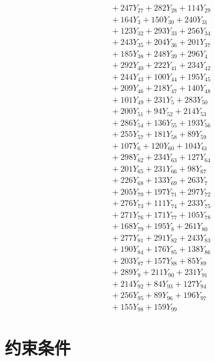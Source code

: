 \documentclass[a4paper,10pt]{article}
\begin{document}
{\begin{align}
&\quad  + 247Y_{27} + 282Y_{28} + 114Y_{29} \\[0.5ex]
&\quad  + 164Y_{3} + 150Y_{30} + 240Y_{31} \\[0.5ex]
&\quad  + 123Y_{32} + 293Y_{33} + 256Y_{34} \\[0.5ex]
&\quad  + 243Y_{35} + 204Y_{36} + 201Y_{37} \\[0.5ex]
&\quad  + 185Y_{38} + 248Y_{39} + 296Y_{4} \\[0.5ex]
&\quad  + 292Y_{40} + 222Y_{41} + 234Y_{42} \\[0.5ex]
&\quad  + 244Y_{43} + 100Y_{44} + 195Y_{45} \\[0.5ex]
&\quad  + 209Y_{46} + 218Y_{47} + 140Y_{48} \\[0.5ex]
&\quad  + 101Y_{49} + 231Y_{5} + 283Y_{50} \\[0.5ex]
&\quad  + 200Y_{51} + 94Y_{52} + 214Y_{53} \\[0.5ex]
&\quad  + 286Y_{54} + 136Y_{55} + 193Y_{56} \\[0.5ex]
&\quad  + 255Y_{57} + 181Y_{58} + 89Y_{59} \\[0.5ex]
&\quad  + 107Y_{6} + 120Y_{60} + 104Y_{61} \\[0.5ex]
&\quad  + 298Y_{62} + 234Y_{63} + 127Y_{64} \\[0.5ex]
&\quad  + 201Y_{65} + 231Y_{66} + 98Y_{67} \\[0.5ex]
&\quad  + 226Y_{68} + 133Y_{69} + 263Y_{7} \\[0.5ex]
&\quad  + 205Y_{70} + 197Y_{71} + 297Y_{72} \\[0.5ex]
&\quad  + 276Y_{73} + 111Y_{74} + 233Y_{75} \\[0.5ex]
&\quad  + 271Y_{76} + 171Y_{77} + 105Y_{78} \\[0.5ex]
&\quad  + 168Y_{79} + 195Y_{8} + 261Y_{80} \\[0.5ex]
&\quad  + 277Y_{81} + 291Y_{82} + 243Y_{83} \\[0.5ex]
&\quad  + 190Y_{84} + 176Y_{85} + 138Y_{86} \\[0.5ex]
&\quad  + 203Y_{87} + 157Y_{88} + 85Y_{89} \\[0.5ex]
&\quad  + 289Y_{9} + 211Y_{90} + 231Y_{91} \\[0.5ex]
&\quad  + 214Y_{92} + 84Y_{93} + 127Y_{94} \\[0.5ex]
&\quad  + 256Y_{95} + 89Y_{96} + 196Y_{97} \\[0.5ex]
&\quad  + 155Y_{98} + 159Y_{99}\nonumber
\end{align}
}

\section{约束条件}
\end{document}
